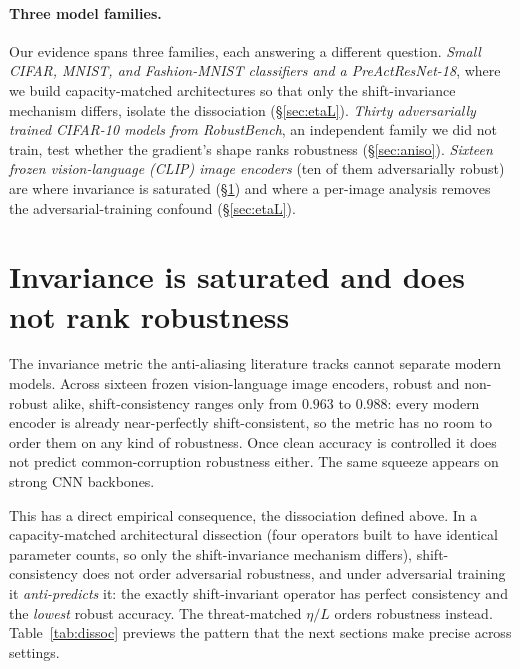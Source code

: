 \documentclass{article}
\theoremstyle{definition}
\newcommand{\etaL}{\eta/L}
\begin{document}
\paragraph{Three model families.} Our evidence spans three families, each answering a different
question. \emph{Small CIFAR, MNIST, and Fashion-MNIST classifiers and a PreActResNet-18}, where we build
capacity-matched architectures so that only the shift-invariance mechanism differs, isolate the
dissociation (\S\ref{sec:etaL}). \emph{Thirty adversarially trained CIFAR-10 models from RobustBench}, an
independent family we did not train, test whether the gradient's shape ranks robustness
(\S\ref{sec:aniso}). \emph{Sixteen frozen vision-language (CLIP) image encoders} (ten of them
adversarially robust) are where invariance is saturated (\S\ref{sec:saturation}) and where a per-image
analysis removes the adversarial-training confound (\S\ref{sec:etaL}).

\section{Invariance is saturated and does not rank robustness}\label{sec:saturation}
The invariance metric the anti-aliasing literature tracks cannot separate modern models. Across sixteen
frozen vision-language image encoders, robust and non-robust alike, shift-consistency ranges only from
$0.963$ to $0.988$: every modern encoder is already near-perfectly shift-consistent, so the metric has
no room to order them on any kind of robustness. Once clean accuracy is controlled it does not predict
common-corruption robustness either. The same squeeze appears on strong CNN backbones.

This has a direct empirical consequence, the dissociation defined above. In a
capacity-matched architectural dissection (four operators built to have identical parameter counts, so
only the shift-invariance mechanism differs), shift-consistency does not order adversarial robustness,
and under adversarial training it \emph{anti-predicts} it: the exactly shift-invariant operator has
perfect consistency and the \emph{lowest} robust accuracy. The threat-matched $\etaL$ orders robustness
instead. Table~\ref{tab:dissoc} previews the pattern that the next sections make precise across
settings.
\end{document}
